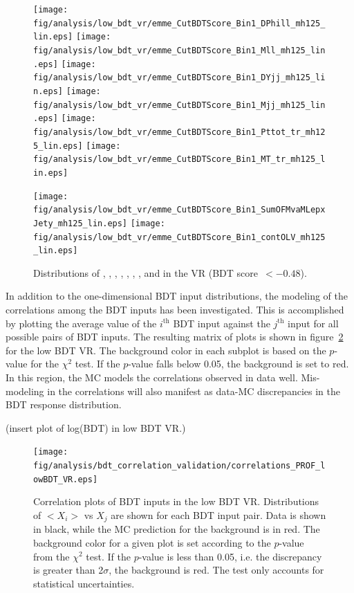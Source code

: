\begin{figure}[h]
  \centering
  \texttt{[image: fig/analysis/low\_bdt\_vr/emme\_CutBDTScore\_Bin1\_DPhill\_mh125\_lin.eps]}
   \texttt{[image: fig/analysis/low\_bdt\_vr/emme\_CutBDTScore\_Bin1\_Mll\_mh125\_lin.eps]}
   \texttt{[image: fig/analysis/low\_bdt\_vr/emme\_CutBDTScore\_Bin1\_DYjj\_mh125\_lin.eps]}
   \texttt{[image: fig/analysis/low\_bdt\_vr/emme\_CutBDTScore\_Bin1\_Mjj\_mh125\_lin.eps]}
   \texttt{[image: fig/analysis/low\_bdt\_vr/emme\_CutBDTScore\_Bin1\_Pttot\_tr\_mh125\_lin.eps]}
   \texttt{[image: fig/analysis/low\_bdt\_vr/emme\_CutBDTScore\_Bin1\_MT\_tr\_mh125\_lin.eps]}

   \texttt{[image: fig/analysis/low\_bdt\_vr/emme\_CutBDTScore\_Bin1\_SumOFMvaMLepxJety\_mh125\_lin.eps]}
   \texttt{[image: fig/analysis/low\_bdt\_vr/emme\_CutBDTScore\_Bin1\_contOLV\_mh125\_lin.eps]}
   \caption{Distributions of \dphill, \mll, \dyjj, \mjj, \pTtot,  \mT,
     \SumMlj, and \lepEtaCent in the \emme VR (BDT score~$<-0.48$). }
  \label{chap:analysis:fig:low_bdt_vr_df}
\end{figure}

In addition to the one-dimensional BDT input distributions, the
modeling of the correlations among the BDT inputs has been
investigated. This is accomplished by plotting the average value of
the $i^{\textrm{th}}$ BDT input against the $j^{\textrm{th}}$ input
for all possible pairs of BDT inputs. The resulting matrix of
plots is shown in figure~\ref{chap:analysis:fig:bdt_corr_vr} for the
low BDT VR. The background color in each subplot is based on the
$p$-value for the $\chi^2$ test. If the $p$-value falls below 0.05,
the background is set to red. In this region, the MC models the correlations observed in
data well. Mis-modeling in the correlations will also manifest as
data-MC discrepancies in the BDT response distribution. 

(insert plot of log(BDT) in low BDT VR.)

\begin{figure}[h!]
  \centering
  \texttt{[image: fig/analysis/bdt\_correlation\_validation/correlations\_PROF\_lowBDT\_VR.eps]}
  \caption{Correlation plots of BDT inputs in the low BDT VR. Distributions of
    $< X_i >$ vs $X_j$ are shown for each BDT input pair. Data is
    shown in black, while the MC prediction for the background is in
    red. The background color for a given plot is set according to the
  $p$-value from the $\chi^2$ test. If the $p$-value is less than
    0.05, i.e. the discrepancy is greater than 2$\sigma$, the
    background is red. The test only accounts for statistical uncertainties.}
  \label{chap:analysis:fig:bdt_corr_vr}
\end{figure}

